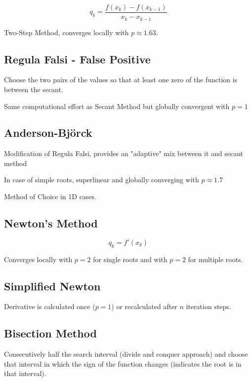 \documentclass[
    a4paper,
    11pt
]{article}
\begin{document}
\begin{equation}
    q_k = \frac{f(x_k) - f(x_{k-1})}{x_k - x_{k-1}}
\end{equation}

Two-Step Method, converges locally with $p \approx 1.63$.

\subsection{Regula Falsi - False Positive}

Choose the two pairs of the values so that at least one zero of the function is
between the secant.

Same computational effort as Secant Method but globally convergent with $p=1$

\subsection{Anderson-Björck}

Modification of Regula Falsi, provides an "adaptive" mix between it and secant
method

In case of simple roots, superlinear and globally converging with $p \approx
1.7$

Method of Choice in 1D cases.

\subsection{Newton's Method}

\begin{equation}
    q_k = f'(x_k)
\end{equation}

Converges locally with $p=2$ for single roots and with $p=2$ for multiple roots.

\subsection{Simplified Newton}

Derivative is calculated once ($p=1$) or recalculated after $n$ iteration steps.

\subsection{Bisection Method}

Consecutively half the search interval (divide and conquer approach) and choose
that interval in which the sign of the function changes (indicates the root is
in that interval).
\end{document}
